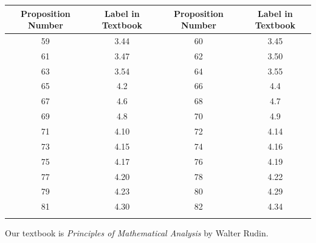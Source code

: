 \documentclass{book}
\newenvironment{allowTableDashes}{\ADLactivate}{\ADLinactivate}
\newcommand{\retTwo}{\hfill\bigbreak}
\newcommand{\myVS}{\vphantom{$\int_a^b$}}
\begin{document}
\begin{allowTableDashes}
      \newpage

      \begin{tabular}{ c|c||c|c }
         Proposition Number & Label in Textbook & Proposition Number & Label in Textbook \\ \hline
         \myVS 59 & 3.44 & 60 & 3.45 \\ \hdashline[10pt/3pt]
         \myVS 61 & 3.47 & 62 & 3.50 \\ \hdashline[10pt/3pt]
         \myVS 63 & 3.54 & 64 & 3.55 \\ \hdashline[10pt/3pt]
         \myVS 65 & 4.2 & 66 & 4.4 \\ \hdashline[10pt/3pt]
         \myVS 67 & 4.6 & 68 & 4.7 \\ \hdashline[10pt/3pt]
         \myVS 69 & 4.8 & 70 & 4.9 \\ \hdashline[10pt/3pt]
         \myVS 71 & 4.10 & 72 & 4.14  \\ \hdashline[10pt/3pt]
         \myVS 73 & 4.15 & 74 & 4.16 \\ \hdashline[10pt/3pt]
         \myVS 75 & 4.17 & 76 & 4.19 \\ \hdashline[10pt/3pt]
         \myVS 77 & 4.20 & 78 & 4.22 \\ \hdashline[10pt/3pt]
         \myVS 79 & 4.23 & 80 & 4.29 \\ \hdashline[10pt/3pt]
         \myVS 81 & 4.30 & 82 & 4.34 \\ \hdashline[10pt/3pt]
      \end{tabular}

   \end{allowTableDashes}

   \retTwo

   Our textbook is \textit{Principles of Mathematical Analysis} by Walter Rudin.
\end{document}
